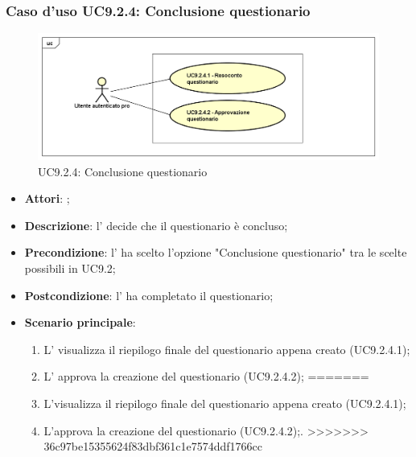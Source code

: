 		\subsubsection{Caso d'uso UC9.2.4: Conclusione questionario}
		\label{UC9.2.4}
		\begin{figure}[h]
			\centering
			\includegraphics[scale=0.5,keepaspectratio]{UML/UC9_2_4.png}
			\caption{UC9.2.4: Conclusione questionario}
		\end{figure}
		\FloatBarrier
		\begin{itemize}
			\item \textbf{Attori}: \uaupro{}; 
			\item \textbf{Descrizione}: l'\uaupro{} decide che il questionario è concluso;
			\item \textbf{Precondizione}: l'\uaupro{} ha scelto l'opzione "Conclusione questionario" tra le scelte possibili in UC9.2;
			\item \textbf{Postcondizione}: l'\uaupro{} ha completato il questionario;
			\item \textbf{Scenario principale}: 
				\begin{enumerate}
<<<<<<< HEAD
					\item L'\uaupro{} visualizza il riepilogo finale del questionario appena creato (UC9.2.4.1); 
					\item L'\uaupro{} approva la creazione del questionario (UC9.2.4.2); 
=======
					\item L'\uaupro visualizza il riepilogo finale del questionario appena creato (UC9.2.4.1); 
					\item L'\uaupro approva la creazione del questionario (UC9.2.4.2);.
>>>>>>> 36c97be15355624f83dbf361c1e7574ddf1766cc
				\end{enumerate}
		\end{itemize}
				
